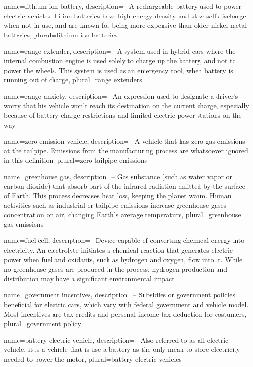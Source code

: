 {
	name=lithium-ion battery,
	description={-- A rechargeable battery used to power electric vehicles. Li-ion batteries have high energy density and slow self-discharge when not in use, and are known for being more expensive than older nickel metal batteries},
	plural=lithium-ion batteries
}

{
	name=range extender,
	description={-- A system used in hybrid cars where the internal combustion engine is used solely to charge up the battery, and not to power the wheels. This system is used as an emergency tool, when battery is running out of charge},
	plural=range extenders
}

{
	name=range anxiety,
	description={-- An expression used to designate a driver's worry that his vehicle won't reach its destination on the current charge, especially because of battery charge restrictions and limited electric power stations on the way}
}

{
	name=zero-emission vehicle,
	description={-- A vehicle that has zero gas emissions at the tailpipe. Emissions from the manufacturing process are whatsoever ignored in this definition},
	plural=zero tailpipe emissions
}

{
	name=greenhouse gas,
	description={-- Gas substance (such as water vapor or carbon dioxide) that absorb part of the infrared radiation emitted by the surface of Earth. This process decreases heat loss, keeping the planet warm. Human activities such as industrial or tailpipe emissions increase greenhouse gases concentration on air, changing Earth's average temperature},
	plural=greenhouse gas emissions
}

{
	name=fuel cell,
	description={-- Device capable of converting chemical energy into electricity. An electrolyte initiates a chemical reaction that generates electric power when fuel and oxidants, such as hydrogen and oxygen, flow into it. While no greenhouse gases are produced in the process, hydrogen production and distribution may have a significant environmental impact}
}

{
	name=government incentives,
	description={-- Subsidies or government policies beneficial for electric cars, which vary with federal government and vehicle model. Most incentives are tax credits and personal income tax deduction for costumers},
	plural=government policy
}

{
	name=battery electric vehicle,
	description={-- Also referred to as all-electric vehicle, it is a vehicle that is use a battery as the only mean to store electricity needed to power the motor},
	plural=battery electric vehicles
}

